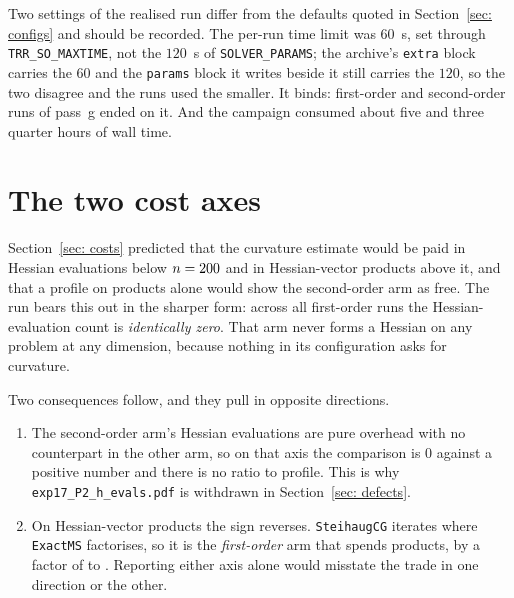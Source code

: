 \documentclass[11pt,a4paper]{article}
\theoremstyle{remark}
\begin{document}
\begin{table}[H]
  \centering
  \caption{Status composition of the \NRuns{} archived runs, both passes pooled.
    \texttt{user} is the pass-g callback of Section~\ref{sec: costs} firing, so it
    counts pass-g runs that reached a first-order point. The last line is the
    subject of Section~\ref{sec: P3}.}
  \label{tab: campaign}
  
\end{table}

Two settings of the realised run differ from the defaults quoted in
Section~\ref{sec: configs} and should be recorded. The per-run time limit was
$60$~s, set through \texttt{TRR\_SO\_MAXTIME}, not the $120$~s of
\texttt{SOLVER\_PARAMS}; the archive's \texttt{extra} block carries the $60$ and
the \texttt{params} block it writes beside it still carries the $120$, so the two
disagree and the runs used the smaller. It binds: \MaxTimeFo{} first-order and
\MaxTimeSo{} second-order runs of pass~g ended on it. And the campaign consumed
about five and three quarter hours of wall time.

\section{The two cost axes}\label{sec: cost axes}

Section~\ref{sec: costs} predicted that the curvature estimate would be paid in
Hessian evaluations below $n = 200{}$ and in Hessian-vector products above
it, and that a profile on products alone would show the second-order arm as free.
The run bears this out in the sharper form: across all \NLamFoTotal{} first-order
runs the Hessian-evaluation count is \emph{identically zero}. That arm never forms
a Hessian on any problem at any dimension, because nothing in its configuration
asks for curvature.

Two consequences follow, and they pull in opposite directions.

\begin{enumerate}[leftmargin=1.8em]
  \item The second-order arm's Hessian evaluations are pure overhead with no
    counterpart in the other arm, so on that axis the comparison is $0$ against a
    positive number and there is no ratio to profile. This is why
    \texttt{exp17\_P2\_h\_evals.pdf} is withdrawn in Section~\ref{sec: defects}.
  \item On Hessian-vector products the sign reverses. \texttt{SteihaugCG} iterates
    where \texttt{ExactMS} factorises, so it is the \emph{first-order} arm that
    spends products, by a factor of \PtwoHpMin{} to \PtwoHpMax{}. Reporting either
    axis alone would misstate the trade in one direction or the other.
\end{enumerate}
\end{document}
